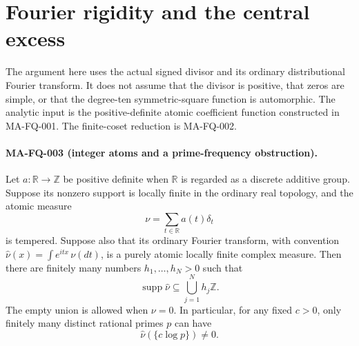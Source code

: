 \section{Fourier rigidity and the central excess}
\label{sec:s5-crystal-rigidity}

The argument here uses the actual signed divisor and its ordinary
distributional Fourier transform.  It does not assume that the
divisor is positive, that zeros are simple, or that the degree-ten
symmetric-square function is automorphic.  The analytic input is
the positive-definite atomic coefficient function constructed in
MA-FQ-001.  The finite-coset reduction is MA-FQ-002.

\paragraph{MA-FQ-003 (integer atoms and a prime-frequency obstruction).}
Let $a:\mathbb R\to\mathbb Z$ be positive definite when $\mathbb R$
is regarded as a discrete additive group.  Suppose its nonzero
support is locally finite in the ordinary real topology, and
the atomic measure
\[
                 \nu=\sum_{t\in\mathbb R}a(t)\delta_t
\tag{MA-FQ.20}
\]
is tempered.  Suppose also that its ordinary Fourier transform,
with convention
$\widehat\nu(x)=\int e^{itx}\,\nu(dt)$, is a purely atomic
locally finite complex measure.  Then there are finitely many
numbers $h_1,\ldots,h_N>0$ such that
\[
                 \operatorname{supp}\widehat\nu
                        \subseteq\bigcup_{j=1}^{N}h_j\mathbb Z.
\tag{MA-FQ.21}
\]
The empty union is allowed when $\nu=0$.
In particular, for any fixed $c>0$, only finitely many distinct
rational primes $p$ can have
\[
                         \widehat\nu(\{c\log p\})\ne0.
\tag{MA-FQ.22}
\]

